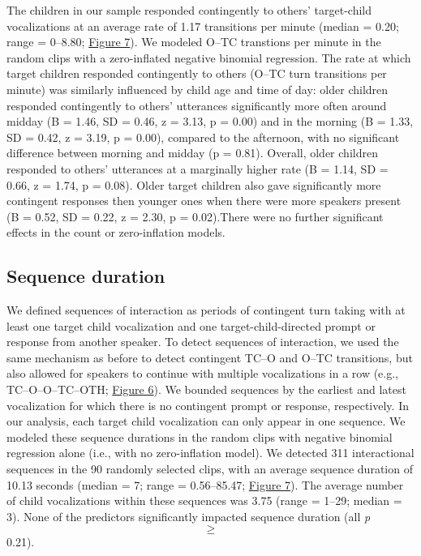 \documentclass[floatsintext,man]{apa6}
\theoremstyle{definition}
\theoremstyle{definition}
\theoremstyle{definition}
\theoremstyle{remark}
\begin{document}
The children in our sample responded contingently to others'
target-child vocalizations at an average rate of 1.17 transitions per
minute (median = 0.20; range = 0--8.80; \protect\hyperlink{fig7}{Figure
7}). We modeled O--TC transtions per minute in the random clips with a
zero-inflated negative binomial regression. The rate at which target
children responded contingently to others (O--TC turn transitions per
minute) was similarly influenced by child age and time of day: older
children responded contingently to others' utterances significantly more
often around midday (B = 1.46, SD = 0.46, z = 3.13, p = 0.00) and in the
morning (B = 1.33, SD = 0.42, z = 3.19, p = 0.00), compared to the
afternoon, with no significant difference between morning and midday (p
= 0.81). Overall, older children responded to others' utterances at a
marginally higher rate (B = 1.14, SD = 0.66, z = 1.74, p = 0.08). Older
target children also gave significantly more contingent responses then
younger ones when there were more speakers present (B = 0.52, SD = 0.22,
z = 2.30, p = 0.02).There were no further significant effects in the
count or zero-inflation models.

\subsection{Sequence duration}\label{sequence-duration}

We defined sequences of interaction as periods of contingent turn taking
with at least one target child vocalization and one
target-child-directed prompt or response from another speaker. To detect
sequences of interaction, we used the same mechanism as before to detect
contingent TC--O and O--TC transitions, but also allowed for speakers to
continue with multiple vocalizations in a row (e.g., TC--O--O--TC--OTH;
\protect\hyperlink{fig6}{Figure 6}). We bounded sequences by the
earliest and latest vocalization for which there is no contingent prompt
or response, respectively. In our analysis, each target child
vocalization can only appear in one sequence. We modeled these sequence
durations in the random clips with negative binomial regression alone
(i.e., with no zero-inflation model). We detected 311 interactional
sequences in the 90 randomly selected clips, with an average sequence
duration of 10.13 seconds (median = 7; range = 0.56--85.47;
\protect\hyperlink{fig7}{Figure 7}). The average number of child
vocalizations within these sequences was 3.75 (range = 1--29; median =
3). None of the predictors significantly impacted sequence duration (all
\emph{p} \[\ge\] 0.21).
\end{document}
